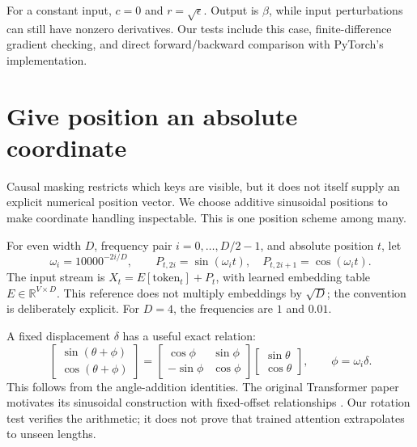 For a constant input, $c=0$ and $r=\sqrt{\epsilon}$. Output is $\beta$, while input perturbations can still have nonzero derivatives. Our tests include this case, finite-difference gradient checking, and direct forward/backward comparison with PyTorch's implementation.

\section{Give position an absolute coordinate}
Causal masking restricts which keys are visible, but it does not itself supply an explicit numerical position vector. We choose additive sinusoidal positions to make coordinate handling inspectable. This is one position scheme among many.

For even width $D$, frequency pair $i=0,\ldots,D/2-1$, and absolute position $t$, let
\begin{equation}
\omega_i=10000^{-2i/D},\qquad
P_{t,2i}=\sin(\omega_it),\quad
P_{t,2i+1}=\cos(\omega_it).
\end{equation}
The input stream is $X_t=E[\mathrm{token}_t]+P_t$, with learned embedding table $E\in\mathbb R^{V\times D}$. This reference does not multiply embeddings by $\sqrt D$; the convention is deliberately explicit. For $D=4$, the frequencies are $1$ and $0.01$.

\begin{center}\end{center}

A fixed displacement $\delta$ has a useful exact relation:
\begin{equation}
\begin{bmatrix}
\sin(\theta+\phi)\\ \cos(\theta+\phi)
\end{bmatrix}
=
\begin{bmatrix}
\cos\phi&\sin\phi\\-\sin\phi&\cos\phi
\end{bmatrix}
\begin{bmatrix}\sin\theta\\\cos\theta\end{bmatrix},
\qquad \phi=\omega_i\delta.
\end{equation}
This follows from the angle-addition identities. The original Transformer paper motivates its sinusoidal construction with fixed-offset relationships \cite{vaswani}. Our rotation test verifies the arithmetic; it does not prove that trained attention extrapolates to unseen lengths.

